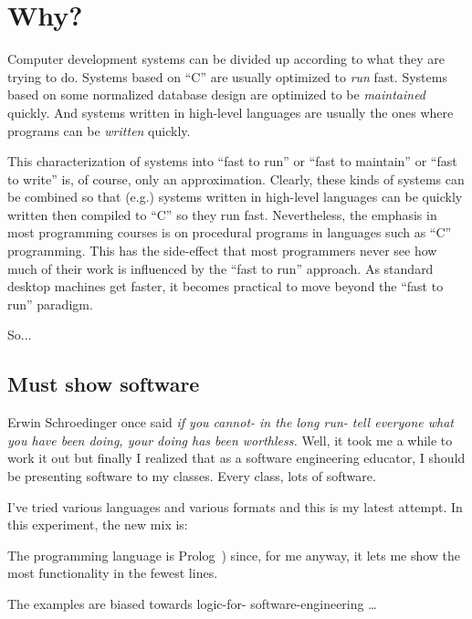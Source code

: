 \section{Why?}

Computer development systems can be divided up according to what
they are trying to do. Systems based on ``C'' are usually
optimized to {\em run} fast. Systems based on some normalized
database design are optimized to be {\em maintained} quickly. And
systems written in high-level languages are usually the ones where
programs can be {\em written} quickly.

This characterization of systems into ``fast to run'' or ``fast to
maintain'' or ``fast to write'' is, of course, only an
approximation. Clearly, these kinds of systems can be combined so
that (e.g.) systems written in high-level languages can be quickly
written then compiled to ``C'' so they run fast. Nevertheless, the
emphasis in most programming courses is on procedural programs in
languages such as ``C'' programming. This has the side-effect that
most programmers never see how much of their work is influenced by
the ``fast to run'' approach. As standard desktop machines get
faster, it becomes practical to move beyond the ``fast to run''
paradigm.

So...

\subsection{Must show software}

Erwin Schroedinger once said {\em if you cannot- in the long run-
tell everyone what you have been doing, your doing has been
worthless.} Well, it took me a while to work it out but finally I
realized that as a software engineering educator, I should be
presenting software to my classes. Every class, lots of software.

I've tried various languages and various formats and this is my latest attempt. In
this experiment, the new  mix is:



 \bi \item

The programming language is
Prolog~\cite{der96,me89zb,bratko01,ok90,sterling94}) since, for me
anyway,  it lets me show the most functionality in the fewest lines.

\item

The examples are biased towards logic-for- software-engineering
\ldots

